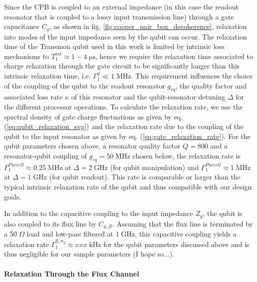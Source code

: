 Since the CPB is coupled to an external impedance (in this case the readout resonator that is coupled to a lossy input transmission line) through a gate capacitance $C_g$, as shown in fig. \ref{fig:cooper_pair_box_decoherence}, relaxation into modes of the input impedance seen by the qubit can occur. The relaxation time of the Transmon qubit used in this work is limited by intrinsic loss mechanisms \citep{} to $T_1^{int}\approx 1-4 \; \mathrm{\mu s}$, hence we require the relaxation time associated to charge relaxation through the gate circuit to be significantly longer than this intrinsic relaxation time, i.e. $\Gamma_1^{g}\ll 1\;\mathrm{MHz}$. This requirement influences the choice of the coupling of the qubit to the readout resonator $g_{rq}$, the quality factor and associated loss rate $\kappa$ of this resonator and the qubit-resonator detuning $\Delta$ for the different processor operations. To calculate the relaxation rate, we use the spectral density of gate charge fluctuations as given by eq. (\ref{eq:qubit_relaxation_svg}) and the relaxation rate due to the coupling of the qubit to the input resonator as given by eq. (\ref{eq:gate_relaxation_rate}). For the qubit parameters chosen above, a resonator quality factor $Q=800$ and a resonator-qubit coupling of $g_{rq}=50\;\mathrm{MHz}$ chosen below, the relaxation rate is $\Gamma_1^{Purcell}\approx 0.25\;\mathrm{MHz}$ at $\Delta = 2\;\mathrm{GHz}$ (for qubit manipulation) and $\Gamma_1^{Purcell}\approx 1\;\mathrm{MHz}$ at $\Delta = 1\;\mathrm{GHz}$ (for qubit readout). This rate is comparable or larger than the typical intrinsic relaxation rate of the qubit and thus compatible with our design goals.

\smallskip

In addition to the capacitive coupling to the input impedance $Z_g$, the qubit is also coupled to its flux line by $C_{g,fl}$. Assuming that the flux line is terminated by a 50 $\Omega$ load and low-pass filtered at $1\;\mathrm{GHz}$, this capacitive coupling yields a relaxation rate $\Gamma_1^{\mathrm{fl},n_g}\approx xxx \;\mathrm{kHz}$ for the qubit parameters discussed above and is thus negligible for our sample parameters (I hope so...).
 
\paragraph{Relaxation Through the Flux Channel} \label{section:relaxation_through_charge}

